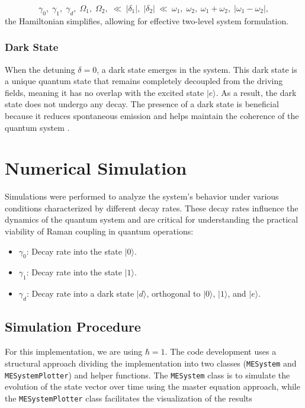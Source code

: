 \documentclass{article}
\begin{document}
$$\gamma_{0},\; \gamma_{1},\;\gamma_{d},\; \Omega_1,\; \Omega_2,\; \ll ~  |\delta_1|,\; |\delta_2| ~
\ll ~\omega_1,\; \omega_2,\; \omega_1+\omega_2,\; |\omega_1-\omega_2|,
$$
the Hamiltonian simplifies, allowing for effective two-level system formulation. 
\subsubsection{Dark State}

When the detuning \(\delta = 0\), a dark state emerges in the system. This dark state is a unique quantum state that remains completely decoupled from the driving fields, meaning it has no overlap with the excited state \(|e\rangle\). As a result, the dark state does not undergo any decay. The presence of a dark state is beneficial because it reduces spontaneous emission and helps maintain the coherence of the quantum system \cite{QuantumWorldUltraColdBook2}.




\section{Numerical Simulation}

Simulations were performed to analyze the system’s behavior under various conditions characterized by different decay rates. These decay rates influence the dynamics of the quantum system and are critical for understanding the practical viability of Raman coupling in quantum operations:

\begin{itemize}
    \item \(\gamma_0\): Decay rate into the state \(|0\rangle\).
    \item \(\gamma_1\): Decay rate into the state \(|1\rangle\).
    \item \(\gamma_d\): Decay rate into a dark state \(|d\rangle\), orthogonal to \(|0\rangle\), \(|1\rangle\), and \(|e\rangle\).
\end{itemize}

\subsection{Simulation Procedure}

For this implementation, we are using \(\hbar = 1\). The code development uses a structural approach dividing the implementation into two classes (\texttt{MESystem} and \texttt{MESystemPlotter}) and helper functions.  The \texttt{MESystem} class is to simulate the evolution of the state vector over time using the master equation approach, while the \texttt{MESystemPlotter} class facilitates the visualization of the results
\end{document}
